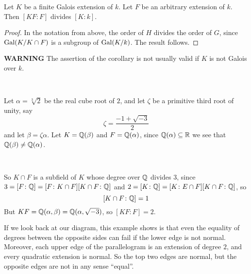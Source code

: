 \begin{corollary}
    Let $K$ be a finite Galois extension of $k$. Let $F$ be an arbitrary extension of $k$. Then $[KF\colon F]$ divides $[K\colon k]$.

    \begin{proof}
        In the notation from above, the order of $H$ divides the order of $G$, since $\text{Gal}(K/K\cap F)$ is a subgroup of $\text{Gal}(K/k)$. The result follows.
    \end{proof}
\end{corollary}
\begin{remark}\textbf{WARNING}
    The assertion of the corollary is not usually valid if $K$ is not Galois over $k$. 

    \

    Let $\alpha = \sqrt[3]{2}$ be the real cube root of $2$, and let $\zeta$ be a primitive third root of unity, say\[
        \zeta = \frac{-1 + \sqrt{-3}}{2}
    \]
    and let $\beta = \zeta\alpha$. Let $K = \mathbb{Q}(\beta)$ and $F=\mathbb{Q}(\alpha)$, since $\mathbb{Q}(\alpha)\subseteq \mathbb{R}$ we see that $\mathbb{Q}(\beta)\neq \mathbb{Q}(\alpha)$.

    \

    So $K\cap F$ is a subfield of $K$ whose degree over $\mathbb{Q}$ divides $3$, since $3 = [F\colon \mathbb{Q}] = [F\colon K\cap F][K\cap F \colon \mathbb{Q}]$ and $2 = [K\colon \mathbb{Q}] = [K\colon E\cap F][K\cap F \colon \mathbb{Q}]$, so \[
        [K\cap F \colon \mathbb{Q}] = 1
    \] 
    But $KF = \mathbb{Q}(\alpha, \beta) = \mathbb{Q}(\alpha, \sqrt{-3})$, so $[KF\colon F] = 2$.

    \begin{bergman}
        If we look back at our diagram, this example shows is that even the equality of degrees between the opposite sides can fail if the lower edge is not normal. Moreover, each upper edge of the parallelogram is an extension of degree $2$, and every quadratic extension is normal. So the top two edges are normal, but the opposite edges are not in any sense ``equal''.
    \end{bergman}
\end{remark}
